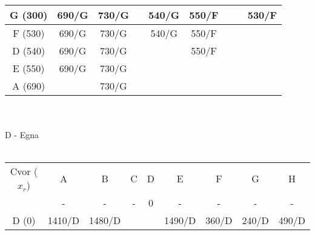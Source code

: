 \documentclass[12pt]{article}
\begin{document}
\begin{enumerate}
\begin{tabular}{|c|c|c|c|c|c|c|c|c|}
G (300)      & 690/G                        & 730/G                        &                          & {\color[HTML]{333333} 540/G} & 550/F                         &                              & {\color[HTML]{FE0000} }      & {\color[HTML]{FE0000} 530/F} \\ \hline
F (530)      & 690/G                        & 730/G                        & {\color[HTML]{000000} }  & {\color[HTML]{FE0000} 540/G} & 550/F                         & {\color[HTML]{FE0000} }      &                              & {\color[HTML]{FE0000} }      \\ \hline
D (540)      & 690/G                        & 730/G                        & {\color[HTML]{FE0000} }  & {\color[HTML]{FE0000} }      & {\color[HTML]{FE0000} 550/F}  &                              &                              &                              \\ \hline
E (550)      & {\color[HTML]{FE0000} 690/G} & 730/G                        & {\color[HTML]{FE0000} }  & {\color[HTML]{FE0000} }      & {\color[HTML]{FE0000} }       &                              &                              &                              \\ \hline
A (690)      & {\color[HTML]{FE0000} }      & {\color[HTML]{FE0000} 730/G} &                          &                              &                               &                              &                              &                              \\ \hline
\end{tabular}
\\
\\
D - Egna
\\
\\
\begin{tabular}{|c|c|c|c|c|c|c|c|c|}
\hline
Cvor ($x_r$) & A                            & B                            & C                            & D                        & E                             & F                            & G                            & H                            \\ \cline{2-9} 
             & {\color[HTML]{000000} -}     & {\color[HTML]{333333} -}     & -                            & {\color[HTML]{FE0000} 0} & -                             & -                            & -                            & -                            \\ \hline
D (0)        & 1410/D                       & 1480/D                       &                              &                          & {\color[HTML]{333333} 1490/D} & 360/D                        & {\color[HTML]{FE0000} 240/D} & 490/D                        \\ \hline

\end{tabular}
\end{enumerate}
\end{document}

